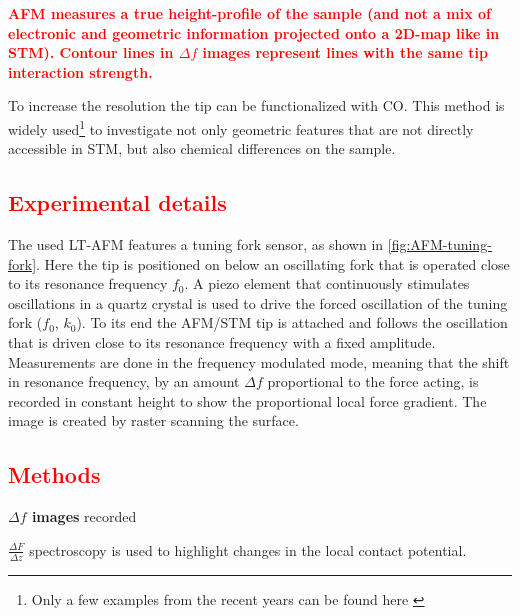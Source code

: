 \textcolor{red}{\textbf{AFM measures a true height-profile of the sample (and not a mix of electronic and geometric information projected onto a 2D-map like in STM). Contour lines in $\Delta f$ images represent lines with the same tip interaction strength.}}

To increase the resolution the tip can be functionalized with CO. This method is widely used\footnote{Only a few examples from the recent years can be found here \cite{albrecht_direct_2016, kawai_multiple_2018, kawai_atomically_2015, schulz_elemental_2018, gross_chemical_2009, pavlicek_generation_2017, schwarz_corrugation_2017}} to investigate not only geometric features that are not directly accessible in STM, but also chemical differences on the sample\cite{wang_exploration_2017}.

\subsection{\textcolor{red}{\textbf{Experimental details}}}
The used LT-AFM features a tuning fork sensor, as shown in \autoref{fig:AFM-tuning-fork}. Here the tip is positioned on below an oscillating fork that is operated close to its resonance frequency $f_0$.  A piezo element that continuously stimulates oscillations in a quartz crystal is used to drive the forced oscillation of the tuning fork ($f_0$, $k_0$). To its end the AFM/STM tip is attached and follows the oscillation that is driven close to its resonance frequency with a fixed amplitude. Measurements are done in the frequency modulated mode, meaning that the shift in resonance frequency, by an amount $\Delta f$  proportional to the force acting, is recorded in constant height to show the proportional local force gradient. The image is created by raster scanning the surface.

\subsection{\textcolor{red}{\textbf{Methods}}}
\textbf{$\Delta f $ images} recorded 

\textbf{$\frac{\Delta F}{\Delta z}$} spectroscopy is used to highlight changes in the local contact potential.

